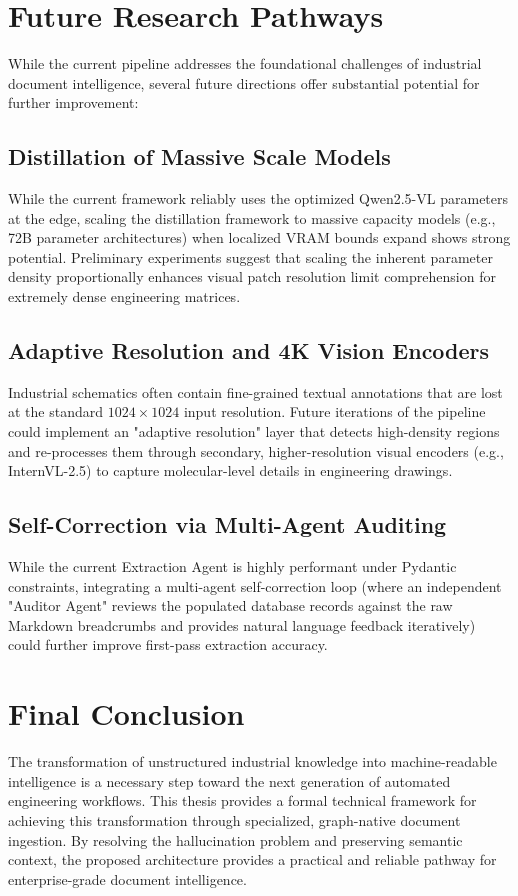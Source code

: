 \section{Future Research Pathways}
\label{sec:future_work}

While the current pipeline addresses the foundational challenges of industrial document intelligence, several future directions offer substantial potential for further improvement:

\subsection{Distillation of Massive Scale Models}
While the current framework reliably uses the optimized Qwen2.5-VL \citep{qwen25} parameters at the edge, scaling the distillation framework to massive capacity models (e.g., 72B parameter architectures) when localized VRAM bounds expand shows strong potential. Preliminary experiments suggest that scaling the inherent parameter density proportionally enhances visual patch resolution limit comprehension for extremely dense engineering matrices.

\subsection{Adaptive Resolution and 4K Vision Encoders}
Industrial schematics often contain fine-grained textual annotations that are lost at the standard $1024 \times 1024$ input resolution. Future iterations of the pipeline could implement an "adaptive resolution" layer that detects high-density regions and re-processes them through secondary, higher-resolution visual encoders (e.g., InternVL-2.5) to capture molecular-level details in engineering drawings.

\subsection{Self-Correction via Multi-Agent Auditing}
While the current Extraction Agent is highly performant under Pydantic constraints, integrating a multi-agent self-correction loop (where an independent "Auditor Agent" reviews the populated database records against the raw Markdown breadcrumbs and provides natural language feedback iteratively) could further improve first-pass extraction accuracy.

\section{Final Conclusion}
The transformation of unstructured industrial knowledge into machine-readable intelligence is a necessary step toward the next generation of automated engineering workflows. This thesis provides a formal technical framework for achieving this transformation through specialized, graph-native document ingestion. By resolving the hallucination problem and preserving semantic context, the proposed architecture provides a practical and reliable pathway for enterprise-grade document intelligence.
